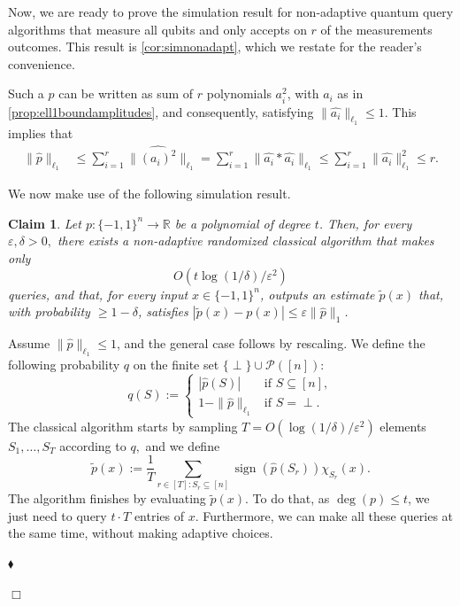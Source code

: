\documentclass[11pt]{article}
\newcommand{\norm}[1]{\|#1\|}
\newcommand{\R}{\mathbb{R}} %
\newcommand{\1}{\mathbf{1}}
\DeclareMathOperator{\sign}{sign}
\theoremstyle{plain}
\newtheorem{claim}[theorem]{Claim}
\theoremstyle{definition}
\theoremstyle{remark}
\renewenvironment{proof}[1][]{
    	\begin{trivlist}
     	\item[\hspace{\labelsep}{\em\noindent Proof#1:\/}]}
     	{{\hfill$\Box$}
    	\end{trivlist}
  }
\newenvironment{claimproof}[1][]{
  		\begin{trivlist}
   		\item[\hspace{\labelsep}{\sc\noindent Proof #1:\/}]}
   		{{\hfill$\blacklozenge$}
  		\end{trivlist}
  }
\begin{document}
Now, we are ready to prove the simulation result for non-adaptive quantum query algorithms that measure all qubits and only accepts on $r$ of the measurements outcomes. This result is \cref{cor:simnonadapt}, which we restate for the reader's convenience. 

\corsimnonadapt*

\begin{proof}
     Such a $p$ can be written as sum of $r$ polynomials $a_i^2$, with $a_i$ as in \cref{prop:ell1boundamplitudes}, and consequently, satisfying $\|\widehat{a_i}\|_{\ell_1}\leq 1$. This implies that
     \begin{align*}
         \|\widehat{p}\|_{\ell_1}&\leq \sum_{i=1}^r \|\widehat{(a_i)^2}\|_{\ell_1} = \sum_{i=1}^r \|\widehat{a_i}*\widehat{a_i}\|_{\ell_1}\leq \sum_{i=1}^r \|\widehat{a_i}\|^2_{\ell_1} \leq r.
     \end{align*}
    
  
We now make use of the following simulation result.
\begin{claim}
\label{lemma:simulation}
   Let $p:\{-1,1\}^n\to \R$ be a polynomial of degree $t$. Then, for every $\varepsilon,\delta>0,$ there exists a non-adaptive randomized classical algorithm that makes only $$O(t\log(1/\delta)/\varepsilon^2)$$ queries, and that, for every input $x \in \{-1,1\}^n$, outputs an estimate $\widetilde p (x)$ that, with probability $\geq 1-\delta$, satisfies $|\widetilde{p}(x)-p(x)|\leq \varepsilon \|\widehat{p}\|_1$.
\end{claim}
\begin{claimproof}
     Assume $\norm{\widehat p}_{\ell_1}\leq 1$, and the general case follows by rescaling. We define the following probability $q$ on the finite set $\{\perp\}\cup\mathcal P([n])$:
    $$ q(S):=\left\{\begin{array}{ll}
        |\widehat p(S)| & \text{if }S\subseteq [n], \\
        1-\norm{\widehat p}_{\ell_1} & \text{if }S=\perp.
    \end{array}\right.$$ 
    The classical algorithm starts by sampling $T=O(\log(1/\delta)/\varepsilon^2)$ elements $S_1,\dots,S_T$ according to $q,$ and we define 
    \begin{equation*}
        \widetilde p(x):=\frac{1}{T}\sum_{r\in [T]:S_r\subseteq [n]}\sign(\widehat p(S_r))\chi_{S_r}(x).
    \end{equation*} 
    The algorithm finishes by evaluating $\widetilde p(x)$. To do that, as $\deg(p)\leq t$, we just need to query $t\cdot T$ entries of $x.$ Furthermore, we can make all these queries at the same time, without making adaptive choices. 
    

\end{claimproof}
\end{proof}
\end{document}
